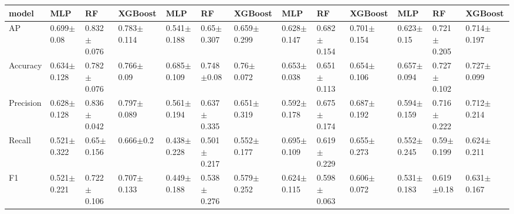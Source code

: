 \begin{tabular}{lllllllllllll}
  \toprule
  model     & MLP             & RF              & XGBoost         & MLP             & RF              & XGBoost         & MLP             & RF              & XGBoost         & MLP             & RF              & XGBoost         \\
  \midrule
  AP        & 0.699$\pm$0.08  & 0.832$\pm$0.076 & 0.783$\pm$0.114 & 0.541$\pm$0.188 & 0.65$\pm$0.307  & 0.659$\pm$0.299 & 0.628$\pm$0.147 & 0.682$\pm$0.154 & 0.701$\pm$0.154 & 0.623$\pm$0.15  & 0.721$\pm$0.205 & 0.714$\pm$0.197 \\
  Accuracy  & 0.634$\pm$0.128 & 0.782$\pm$0.076 & 0.766$\pm$0.09  & 0.685$\pm$0.109 & 0.748$\pm$0.08  & 0.76$\pm$0.072  & 0.653$\pm$0.038 & 0.651$\pm$0.113 & 0.654$\pm$0.106 & 0.657$\pm$0.094 & 0.727$\pm$0.102 & 0.727$\pm$0.099 \\
  Precision & 0.628$\pm$0.128 & 0.836$\pm$0.042 & 0.797$\pm$0.089 & 0.561$\pm$0.194 & 0.637$\pm$0.335 & 0.651$\pm$0.319 & 0.592$\pm$0.178 & 0.675$\pm$0.174 & 0.687$\pm$0.192 & 0.594$\pm$0.159 & 0.716$\pm$0.222 & 0.712$\pm$0.214 \\
  Recall    & 0.521$\pm$0.322 & 0.65$\pm$0.156  & 0.666$\pm$0.2   & 0.438$\pm$0.228 & 0.501$\pm$0.217 & 0.552$\pm$0.177 & 0.695$\pm$0.109 & 0.619$\pm$0.229 & 0.655$\pm$0.273 & 0.552$\pm$0.245 & 0.59$\pm$0.199  & 0.624$\pm$0.211 \\
  F1        & 0.521$\pm$0.221 & 0.722$\pm$0.106 & 0.707$\pm$0.133 & 0.449$\pm$0.188 & 0.538$\pm$0.276 & 0.579$\pm$0.252 & 0.624$\pm$0.115 & 0.598$\pm$0.063 & 0.606$\pm$0.072 & 0.531$\pm$0.183 & 0.619$\pm$0.18  & 0.631$\pm$0.167 \\
  \bottomrule
\end{tabular}
